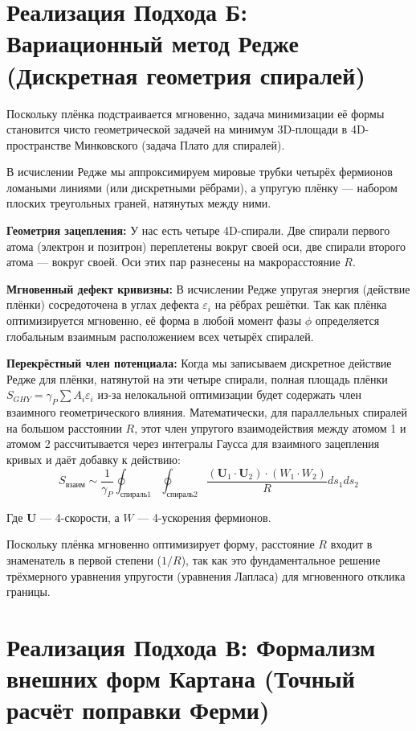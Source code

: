 \documentclass[12pt,a4paper]{article}
\begin{document}
\section*{Реализация Подхода Б: Вариационный метод Редже (Дискретная геометрия спиралей)}

Поскольку плёнка подстраивается мгновенно, задача минимизации её формы становится чисто геометрической задачей на минимум 3D-площади в 4D-пространстве Минковского (задача Плато для спиралей).

В исчислении Редже мы аппроксимируем мировые трубки четырёх фермионов ломаными линиями (или дискретными рёбрами), а упругую плёнку — набором плоских треугольных граней, натянутых между ними.

\textbf{Геометрия зацепления:} У нас есть четыре 4D-спирали. Две спирали первого атома (электрон и позитрон) переплетены вокруг своей оси, две спирали второго атома — вокруг своей. Оси этих пар разнесены на макрорасстояние $R$.

\textbf{Мгновенный дефект кривизны:} В исчислении Редже упругая энергия (действие плёнки) сосредоточена в углах дефекта $\varepsilon_i$ на рёбрах решётки. Так как плёнка оптимизируется мгновенно, её форма в любой момент фазы $\phi$ определяется глобальным взаимным расположением всех четырёх спиралей.

\textbf{Перекрёстный член потенциала:} Когда мы записываем дискретное действие Редже для плёнки, натянутой на эти четыре спирали, полная площадь плёнки $S_{GHY} = \gamma_P \sum A_i \varepsilon_i$ из-за нелокальной оптимизации будет содержать член взаимного геометрического влияния. Математически, для параллельных спиралей на большом расстоянии $R$, этот член упругого взаимодействия между атомом 1 и атомом 2 рассчитывается через интегралы Гаусса для взаимного зацепления кривых и даёт добавку к действию:
\begin{equation}
S_{взаим} \sim \frac{1}{\gamma_P} \oint_{спираль 1} \oint_{спираль 2} \frac{(\mathbf{U}_1 \cdot \mathbf{U}_2) \cdot (W_1 \cdot W_2)}{R} ds_1 ds_2
\end{equation}

Где $\mathbf{U}$ — 4-скорости, а $W$ — 4-ускорения фермионов.

Поскольку плёнка мгновенно оптимизирует форму, расстояние $R$ входит в знаменатель в первой степени ($1/R$), так как это фундаментальное решение трёхмерного уравнения упругости (уравнения Лапласа) для мгновенного отклика границы.

\section*{Реализация Подхода В: Формализм внешних форм Картана (Точный расчёт поправки Ферми)}
\end{document}
